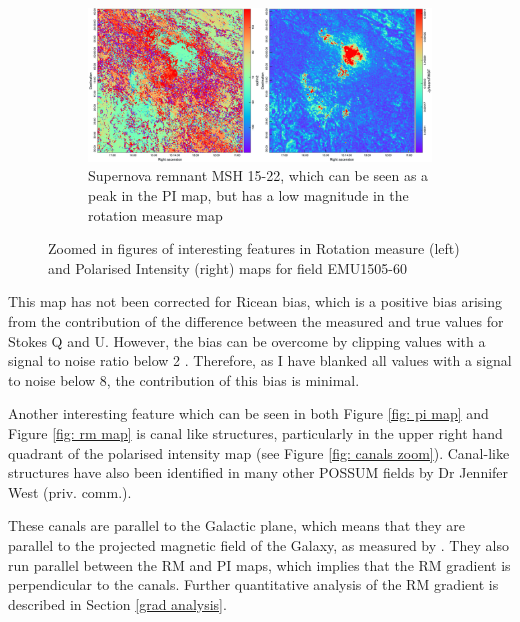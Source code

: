 \begin{figure}
      \begin{subfigure}[b]{\textwidth}
        \includegraphics[width=\linewidth]{Thesis_Template/Figures/RM_PI_MSH 15-22.png}
        \caption{Supernova remnant MSH 15-22, which can be seen as a peak in the PI map, but has a low magnitude in the rotation measure map}
        \label{fig: sn zoom}
    \end{subfigure}
    

   
    
    \caption[Features of interest in field EMU1505-60]{Zoomed in figures of interesting features in Rotation measure (left) and Polarised Intensity (right) maps for field EMU1505-60}
    \label{fig:pi and rm zooms}
\end{figure}



This map has not been corrected for Ricean bias, which is a positive bias arising from the contribution of the difference between the measured and true values for Stokes Q and U. However, the bias can be overcome by clipping values with a signal to noise ratio below 2 \cite{muller_2017}. Therefore, as I have blanked all values with a signal to noise below 8, the contribution of this bias is minimal.

Another interesting feature which can be seen in both Figure \ref{fig: pi map} and Figure \ref{fig: rm map} is canal like structures, particularly in the upper right hand quadrant of the polarised intensity map (see Figure \ref{fig: canals zoom}). Canal-like structures have also been identified in many other POSSUM fields by Dr Jennifer West (priv. comm.).

These canals are parallel to the Galactic plane, which means that they are parallel to the projected magnetic field of the Galaxy, as measured by \cite{Planck_XXV}. They also run parallel between the RM and PI maps, which implies that the RM gradient is perpendicular to the canals. Further quantitative analysis of the RM gradient is described in Section \ref{grad analysis}. 

